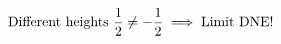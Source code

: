 \documentclass[preview]{standalone}
\begin{document}
\begin{align*}
\special{dvisvgm:raw <g id='unique000'>}\text{Different heights } \frac{1}{2} \neq -\frac{1}{2} \implies \text{Limit DNE!}\special{dvisvgm:raw </g>}
\end{align*}
\end{document}
